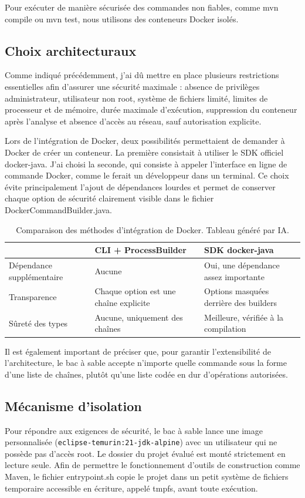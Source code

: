 \documentclass[11pt,a4paper]{article}
\begin{document}
Pour exécuter de manière sécurisée des commandes non fiables, comme mvn compile ou mvn test, nous utilisons des conteneurs Docker isolés.

\subsection{Choix architecturaux}
Comme indiqué précédemment, j'ai dû mettre en place plusieurs restrictions essentielles afin d'assurer une sécurité maximale : absence de privilèges administrateur, utilisateur non root, système de fichiers limité, limites de processeur et de mémoire, durée maximale d'exécution, suppression du conteneur après l'analyse et absence d'accès au réseau, sauf autorisation explicite.

Lors de l'intégration de Docker, deux possibilités permettaient de demander à Docker de créer un conteneur. La première consistait à utiliser le SDK officiel docker-java. J'ai choisi la seconde, qui consiste à appeler l'interface en ligne de commande Docker, comme le ferait un développeur dans un terminal. Ce choix évite principalement l'ajout de dépendances lourdes et permet de conserver chaque option de sécurité clairement visible dans le fichier DockerCommandBuilder.java.

\begin{table}[h]
\centering
\small
\begin{tabular}{@{}p{4.2cm}p{4.8cm}p{4.8cm}@{}}
\toprule
 & \textbf{CLI + ProcessBuilder} & \textbf{SDK docker-java} \\
\midrule
Dépendance supplémentaire & Aucune & Oui, une dépendance assez importante \\
Transparence & Chaque option est une chaîne explicite & Options masquées derrière des builders \\
Sûreté des types & Aucune, uniquement des chaînes & Meilleure, vérifiée à la compilation \\
\bottomrule
\end{tabular}
\caption{Comparaison des méthodes d'intégration de Docker. Tableau généré par IA.}
\label{tab:docker-choice}
\end{table}

Il est également important de préciser que, pour garantir l'extensibilité de l'architecture, le bac à sable accepte n'importe quelle commande sous la forme d'une liste de chaînes, plutôt qu'une liste codée en dur d'opérations autorisées.

\subsection{Mécanisme d'isolation}
Pour répondre aux exigences de sécurité, le bac à sable lance une image personnalisée (\texttt{eclipse-temurin:21\allowbreak-jdk\allowbreak-alpine}) avec un utilisateur qui ne possède pas d'accès root. Le dossier du projet évalué est monté strictement en lecture seule. Afin de permettre le fonctionnement d'outils de construction comme Maven, le fichier entrypoint.sh copie le projet dans un petit système de fichiers temporaire accessible en écriture, appelé tmpfs, avant toute exécution.
\end{document}
